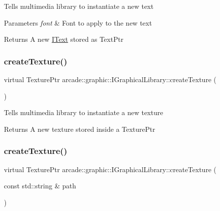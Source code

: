 Tells multimedia library to instantiate a new text 
\begin{DoxyParams}{Parameters}
{\em font} & Font to apply to the new text \\
\hline
\end{DoxyParams}
\begin{DoxyReturn}{Returns}
A new \mbox{\hyperlink{classarcade_1_1graphic_1_1_i_text}{I\+Text}} stored as Text\+Ptr 
\end{DoxyReturn}
\mbox{\label{classarcade_1_1graphic_1_1_i_graphical_library_a034577aa2702771ba0834e1ad98ed5a0}} 
\subsubsection{\texorpdfstring{createTexture()}{createTexture()}\hspace{0.1cm}{\footnotesize\ttfamily [1/2]}}
{\footnotesize\ttfamily virtual Texture\+Ptr arcade\+::graphic\+::\+I\+Graphical\+Library\+::create\+Texture (\begin{DoxyParamCaption}{ }\end{DoxyParamCaption})\hspace{0.3cm}{\ttfamily [pure virtual]}}

Tells multimedia library to instantiate a new texture \begin{DoxyReturn}{Returns}
A new texture stored inside a Texture\+Ptr 
\end{DoxyReturn}
\mbox{\label{classarcade_1_1graphic_1_1_i_graphical_library_a8c14d0d54d1216279ad5c80702f53086}} 
\subsubsection{\texorpdfstring{createTexture()}{createTexture()}\hspace{0.1cm}{\footnotesize\ttfamily [2/2]}}
{\footnotesize\ttfamily virtual Texture\+Ptr arcade\+::graphic\+::\+I\+Graphical\+Library\+::create\+Texture (\begin{DoxyParamCaption}\item[{const std\+::string \&}]{path }\end{DoxyParamCaption})\hspace{0.3cm}{\ttfamily [pure virtual]}}

